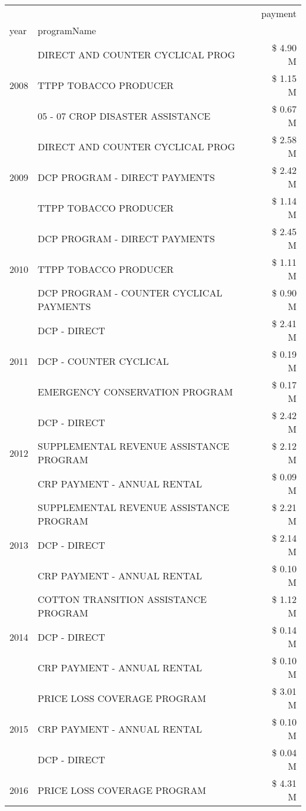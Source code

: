 \begin{tabular}{llr}
\toprule
 &  & payment \\
year & programName &  \\
\midrule
\multirow[t]{3}{*}{2008} & DIRECT AND COUNTER CYCLICAL PROG & \$ 4.90 M \\
 & TTPP TOBACCO PRODUCER & \$ 1.15 M \\
 & 05 - 07 CROP DISASTER ASSISTANCE & \$ 0.67 M \\
\cline{1-3}
\multirow[t]{3}{*}{2009} & DIRECT AND COUNTER CYCLICAL PROG & \$ 2.58 M \\
 & DCP PROGRAM - DIRECT PAYMENTS & \$ 2.42 M \\
 & TTPP TOBACCO PRODUCER & \$ 1.14 M \\
\cline{1-3}
\multirow[t]{3}{*}{2010} & DCP PROGRAM - DIRECT PAYMENTS & \$ 2.45 M \\
 & TTPP TOBACCO PRODUCER & \$ 1.11 M \\
 & DCP PROGRAM - COUNTER CYCLICAL PAYMENTS & \$ 0.90 M \\
\cline{1-3}
\multirow[t]{3}{*}{2011} & DCP - DIRECT & \$ 2.41 M \\
 & DCP - COUNTER CYCLICAL & \$ 0.19 M \\
 & EMERGENCY CONSERVATION PROGRAM & \$ 0.17 M \\
\cline{1-3}
\multirow[t]{3}{*}{2012} & DCP - DIRECT & \$ 2.42 M \\
 & SUPPLEMENTAL REVENUE ASSISTANCE PROGRAM & \$ 2.12 M \\
 & CRP PAYMENT - ANNUAL RENTAL & \$ 0.09 M \\
\cline{1-3}
\multirow[t]{3}{*}{2013} & SUPPLEMENTAL REVENUE ASSISTANCE PROGRAM & \$ 2.21 M \\
 & DCP - DIRECT & \$ 2.14 M \\
 & CRP PAYMENT - ANNUAL RENTAL & \$ 0.10 M \\
\cline{1-3}
\multirow[t]{3}{*}{2014} & COTTON TRANSITION ASSISTANCE PROGRAM & \$ 1.12 M \\
 & DCP - DIRECT & \$ 0.14 M \\
 & CRP PAYMENT - ANNUAL RENTAL & \$ 0.10 M \\
\cline{1-3}
\multirow[t]{3}{*}{2015} & PRICE LOSS COVERAGE PROGRAM & \$ 3.01 M \\
 & CRP PAYMENT - ANNUAL RENTAL & \$ 0.10 M \\
 & DCP - DIRECT & \$ 0.04 M \\
\cline{1-3}
\multirow[t]{3}{*}{2016} & PRICE LOSS COVERAGE PROGRAM & \$ 4.31 M \\

\end{tabular}
